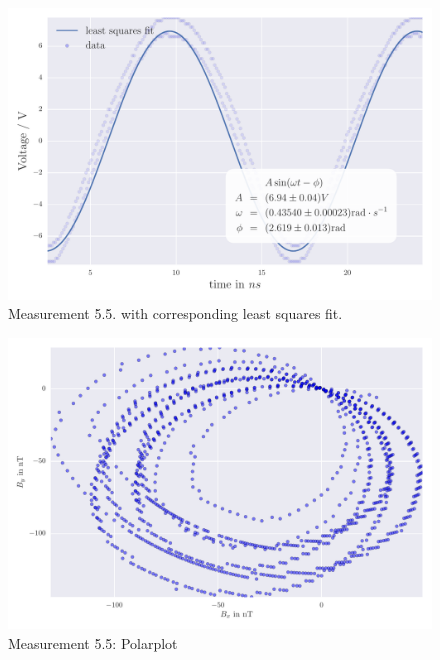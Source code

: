 \begin{figure}[H]
    \centering
    \includegraphics[width=0.7\linewidth]{analysis/figures/fit5_5}
    \caption{Measurement 5.5. with corresponding least squares fit.}
    \label{fig:5_5_plot}
\end{figure}

\begin{figure}[H]
    \centering
    \includegraphics[width=0.7\linewidth]{analysis/figures/polar5_5}
    \caption{Measurement 5.5: Polarplot}
    \label{fig:5_5_polar}
\end{figure}


